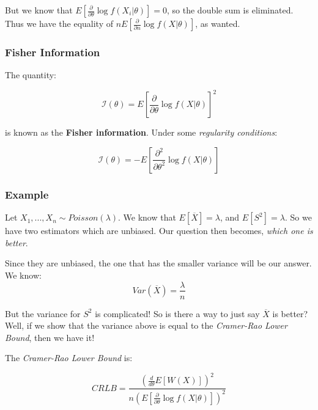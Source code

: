 \documentclass{article}
\begin{document}
But we know that $E\left[\frac{\partial}{\partial \theta}\log f(X_i|\theta) \right] = 0$, so the double sum is eliminated. Thus we have the equality of $n E\left[\frac{\partial}{\partial n}\log f(X|\theta) \right]$, as wanted.

\subsubsection{Fisher Information}

The quantity:

\begin{equation*}
    \mathcal{I}(\theta) = E\left[\frac{\partial}{\partial \theta} \log f(X|\theta) \right]^2
\end{equation*}

is known as the \textbf{Fisher information}. Under some \textit{regularity conditions}:

\begin{equation*}
    \mathcal{I}(\theta) = - E\left[\frac{\partial^2}{\partial \theta^2}\log f(X|\theta) \right]
\end{equation*}


\subsubsection*{Example}

Let $X_1,...,X_n \sim Poisson(\lambda)$. We know that $E[\overline{X}] = \lambda$, and $E[S^2] = \lambda$. So we have two estimators which are unbiased. Our question then becomes, \textit{which one is better}.

Since they are unbiased, the one that has the smaller variance will be our answer. We know:
\begin{equation*}
    Var(\overline{X}) = \frac{\lambda}{n}
\end{equation*}

But the variance for $S^2$ is complicated! So is there a way to just say $\overline{X}$ is better? Well, if we show that the variance above is equal to the \textit{Cramer-Rao Lower Bound}, then we have it!

The \textit{Cramer-Rao Lower Bound} is:

\begin{equation*}
        CRLB = \frac{\left(\frac{d}{d\theta} E[W(X)]\right)^2}{n\left(E\left[\frac{\partial}{\partial \theta} \log f(X|\theta) \right] \right)^2}
\end{equation*}
\end{document}
